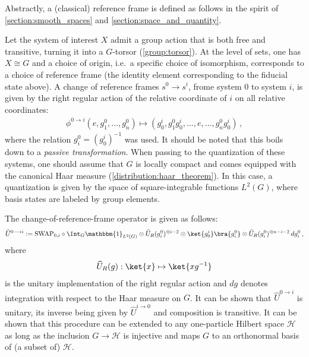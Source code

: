     Abstractly, a (classical) reference frame is defined as follows in the spirit of \cref{section:smooth_spaces} and \cref{section:space_and_quantity}.

    Let the system of interest $X$ admit a group action that is both free and transitive, turning it into a $G$-torsor (\cref{group:torsor}). At the level of sets, one has $X\cong G$ and a choice of origin, i.e.~a specific choice of isomorphism, corresponds to a choice of reference frame (the identity element corresponding to the fiducial state above). A change of reference frames $s^0\longrightarrow s^i$, frome system $0$ to system $i$, is given by the right regular action of the relative coordinate of $i$ on all relative coordinates:
    \begin{gather}
        \phi^{0\longrightarrow i}(e,g^0_1,\ldots,g^0_n)\mapsto(g^i_0,g^0_1g^i_0,\ldots,e,\ldots,g^0_ng^i_0)\,,
    \end{gather}
    where the relation $g^0_i=(g^i_0)^{-1}$ was used. It should be noted that this boils down to a \textit{passive transformation}. When passing to the quantization of these systems, one should assume that $G$ is locally compact and comes equipped with the canonical Haar measure (\cref{distribution:haar_theorem}). In this case, a quantization is given by the space of square-integrable functions $L^2(G)$, where basis states are labeled by group elements.


    The change-of-reference-frame operator is given as follows:
    \begin{gather}
        \widehat{U}^{0\longrightarrow i} := \mathrm{SWAP}_{0,i}\circ\Int_G\mathbbm{1}_{L^2(G)}\otimes \widehat{U}_R(g_i^0)^{\otimes i-2}\otimes\ket{g^i_0}\bra{g^0_i}\otimes\widehat{U}_R(g_i^0)^{\otimes n-i-2}\,dg^0_i\,,
    \end{gather}
    where
    \begin{gather}
        \widehat{U}_R(g):\ket{x}\mapsto\ket{xg^{-1}}
    \end{gather}
    is the unitary implementation of the right regular action and $dg$ denotes integration with respect to the Haar measure on $G$. It can be shown that $\widehat{U}^{0\longrightarrow i}$ is unitary, its inverse being given by $\widehat{U}^{i\longrightarrow 0}$ and composition is transitive. It can be shown that this procedure can be extended to any one-particle Hilbert space $\mathcal{H}$ as long as the inclusion $G\rightarrow\mathcal{H}$ is injective and maps $G$ to an orthonormal basis of (a subset of) $\mathcal{H}$.

